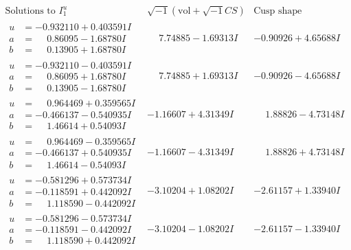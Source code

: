 \documentclass[1p]{elsarticle_modified}
\theoremstyle{definition}
\newcommand{\I}{\sqrt{-1}}
\begin{document}
$$\begin{array}{c|c|c}  
\text{Solutions to }I^u_{1}& \I (\text{vol} + \sqrt{-1}CS) & \text{Cusp shape}\\
 \hline 
\begin{aligned}
u &= -0.932110 + 0.403591 I \\
a &= \phantom{-}0.86095 - 1.68780 I \\
b &= \phantom{-}0.13905 + 1.68780 I\end{aligned}
 & \phantom{-}7.74885 - 1.69313 I & -0.90926 + 4.65688 I \\ \hline\begin{aligned}
u &= -0.932110 - 0.403591 I \\
a &= \phantom{-}0.86095 + 1.68780 I \\
b &= \phantom{-}0.13905 - 1.68780 I\end{aligned}
 & \phantom{-}7.74885 + 1.69313 I & -0.90926 - 4.65688 I \\ \hline\begin{aligned}
u &= \phantom{-}0.964469 + 0.359565 I \\
a &= -0.466137 - 0.540935 I \\
b &= \phantom{-}1.46614 + 0.54093 I\end{aligned}
 & -1.16607 + 4.31349 I & \phantom{-}1.88826 - 4.73148 I \\ \hline\begin{aligned}
u &= \phantom{-}0.964469 - 0.359565 I \\
a &= -0.466137 + 0.540935 I \\
b &= \phantom{-}1.46614 - 0.54093 I\end{aligned}
 & -1.16607 - 4.31349 I & \phantom{-}1.88826 + 4.73148 I \\ \hline\begin{aligned}
u &= -0.581296 + 0.573734 I \\
a &= -0.118591 + 0.442092 I \\
b &= \phantom{-}1.118590 - 0.442092 I\end{aligned}
 & -3.10204 + 1.08202 I & -2.61157 + 1.33940 I \\ \hline\begin{aligned}
u &= -0.581296 - 0.573734 I \\
a &= -0.118591 - 0.442092 I \\
b &= \phantom{-}1.118590 + 0.442092 I\end{aligned}
 & -3.10204 - 1.08202 I & -2.61157 - 1.33940 I \\ \hline\begin{aligned}

\end{aligned}
\end{array}$$
\end{document}
